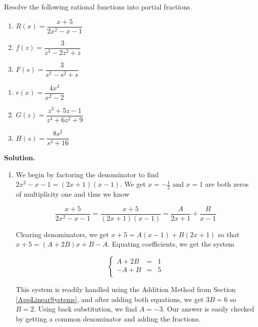 \documentclass{ximera}
\begin{document}
\begin{example}  Resolve the following rational functions into partial fractions.

\begin{multicols}{3}
\begin{enumerate}

\item  $R(x) = \dfrac{x+5}{2x^2-x-1}$

\item  $f(z) = \dfrac{3}{z^3-2z^2+z}$

\item  $F(s) = \dfrac{3}{s^3-s^2+s}$

\setcounter{HW}{\value{enumi}}
\end{enumerate}
\end{multicols}


\begin{multicols}{3}
\begin{enumerate}
\setcounter{enumi}{\value{HW}}

\item  $r(x) = \dfrac{4x^3}{x^2-2}$

\item  $G(z) = \dfrac{z^3+5z-1}{z^4+6z^2+9}$

\item  $H(s) = \dfrac{8s^2}{s^4+16}$

\end{enumerate}
\end{multicols}
{\bf Solution.}  

\begin{enumerate}

\item  We begin by factoring the denominator to find $2x^2-x-1 = (2x+1)(x-1)$.  We get $x=-\frac{1}{2}$ and $x=1$ are both zeros of multiplicity one and thus we know

\[\dfrac{x+5}{2x^2-x-1} = \dfrac{x+5}{(2x+1)(x-1)} = \dfrac{A}{2x+1} + \dfrac{B}{x-1}\]

Clearing denominators, we get $x+5 = A(x-1) + B(2x+1)$ so that $x + 5 = (A+2B)x + B-A$.  Equating coefficients, we get the system

\[ \left\{ \begin{array}{rcr}  A+2B & = & 1 \\ -A+B & = & 5 \\ \end{array} \right.\]

This system is readily handled using the Addition Method from Section \ref{AppLinearSystems}, and after adding both equations, we get $3B = 6$ so $B = 2$.  Using back substitution, we find $A = -3$.  Our answer is easily checked by getting a common denominator and adding the fractions.


\end{enumerate}
\end{example}
\end{document}
